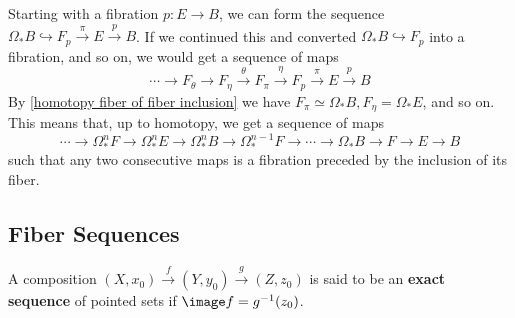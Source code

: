 Starting with a fibration $p : E \rightarrow B$, we can form the sequence $\Omega_* B \hookrightarrow F_p \stackrel{\pi}{\rightarrow} E \stackrel{p}{\rightarrow} B$. If we continued this and converted $\Omega_* B \hookrightarrow F_p$ into a fibration, and so on, we would get a sequence of maps
\[ \cdots \longrightarrow F_\theta \longrightarrow F_\eta \stackrel{\theta}{\longrightarrow} F_\pi \stackrel{\eta}{\longrightarrow} F_p \stackrel{\pi}{\longrightarrow} E \stackrel{p}{\longrightarrow} B \]
By \cref{homotopy fiber of fiber inclusion} we have $F_\pi \simeq \Omega_* B, F_\eta = \Omega_* E$, and so on. This means that, up to homotopy, we get a sequence of maps
\begin{equation}
\label{fiber sequence}
\cdots \longrightarrow \Omega_*^n F \longrightarrow \Omega_*^n E \longrightarrow \Omega_*^n B \longrightarrow \Omega_*^{n-1} F \longrightarrow \cdots \longrightarrow \Omega_* B \longrightarrow F \longrightarrow E \longrightarrow B
\end{equation}
such that any two consecutive maps is a fibration preceded by the inclusion of its fiber.





\subsection{Fiber Sequences}


A composition $(X,x_0) \stackrel{f}{\rightarrow} (Y,y_0) \stackrel{g}{\rightarrow} (Z,z_0)$ is said to be an \textbf{exact sequence} of pointed sets if $\image f = g^{-1}(z_0)$. 

